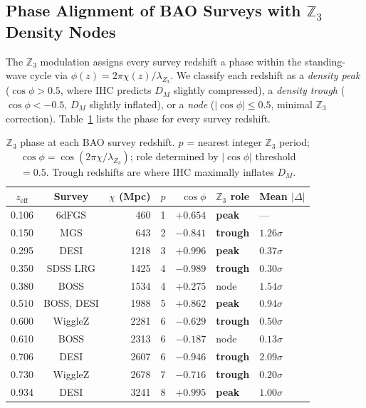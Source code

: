 \documentclass[12pt,a4paper]{article}
\begin{document}
\subsection{Phase Alignment of BAO Surveys with $\mathbb{Z}_3$ Density Nodes}
\label{sec:z3phase}

The $\mathbb{Z}_3$ modulation assigns every survey redshift a phase within the standing-wave
cycle via $\phi(z) = 2\pi\chi(z)/\lambda_{Z_3}$. We classify each redshift as a
\emph{density peak} ($\cos\phi > 0.5$, where IHC predicts $D_M$ slightly compressed),
a \emph{density trough} ($\cos\phi < -0.5$, $D_M$ slightly inflated), or a
\emph{node} ($|\cos\phi| \leq 0.5$, minimal $\mathbb{Z}_3$ correction). Table~\ref{tab:z3phase}
lists the phase for every survey redshift.

\begin{table}[htbp]
\centering
\caption{$\mathbb{Z}_3$ phase at each BAO survey redshift. $p$ = nearest integer $\mathbb{Z}_3$ period;
$\cos\phi = \cos(2\pi\chi/\lambda_{Z_3})$; role determined by $|\cos\phi|$ threshold
$= 0.5$. Trough redshifts are where IHC maximally inflates $D_M$.}
\label{tab:z3phase}
\small
\begin{tabular}{ccrcrll}
\toprule
$z_\mathrm{eff}$ & Survey & $\chi$ (Mpc) & $p$ & $\cos\phi$ & $\mathbb{Z}_3$ role & Mean $|\Delta|$ \\
\midrule
0.106 & 6dFGS     & 460  & 1  & $+0.654$ & \textbf{peak}   & --- \\
0.150 & MGS        & 643  & 2  & $-0.841$ & \textbf{trough} & $1.26\sigma$ \\
0.295 & DESI       & 1218 & 3  & $+0.996$ & \textbf{peak}   & $0.37\sigma$ \\
0.350 & SDSS LRG   & 1425 & 4  & $-0.989$ & \textbf{trough} & $0.30\sigma$ \\
0.380 & BOSS       & 1534 & 4  & $+0.275$ & node            & $1.54\sigma$ \\
0.510 & BOSS, DESI & 1988 & 5  & $+0.862$ & \textbf{peak}   & $0.94\sigma$ \\
0.600 & WiggleZ    & 2281 & 6  & $-0.629$ & \textbf{trough} & $0.50\sigma$ \\
0.610 & BOSS       & 2313 & 6  & $-0.187$ & node            & $0.13\sigma$ \\
0.706 & DESI       & 2607 & 6  & $-0.946$ & \textbf{trough} & $2.09\sigma$ \\
0.730 & WiggleZ    & 2678 & 7  & $-0.716$ & \textbf{trough} & $0.20\sigma$ \\
0.934 & DESI       & 3241 & 8  & $+0.995$ & \textbf{peak}   & $1.00\sigma$ \\

\end{tabular}
\end{table}
\end{document}
